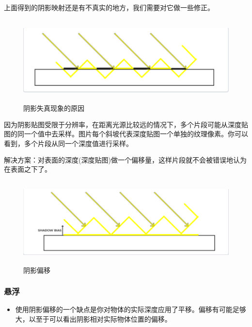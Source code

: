 \documentclass{article}
\begin{document}
	上面得到的阴影映射还是有不真实的地方，我们需要对它做一些修正。
		 \begin{figure}[H]
		\begin{center}
			\includegraphics[width=15cm,height=4.5cm]{yinyingshizhen}
			\caption{阴影失真现象的原因}	\label{yinying.label}
		\end{center}
	\end{figure}

因为阴影贴图受限于分辨率，在距离光源比较远的情况下，多个片段可能从深度贴图的同一个值中去采样。图片每个斜坡代表深度贴图一个单独的纹理像素。你可以看到，多个片段从同一个深度值进行采样。

  解决方案：对表面的深度(深度贴图)做一个偏移量，这样片段就不会被错误地认为在表面之下了。
  
  	 \begin{figure}[H]
  	\begin{center}
  		\includegraphics[width=15cm,height=4.5cm]{bias}
  		\caption{阴影偏移}	\label{pianyi.label}
  	\end{center}
  \end{figure}

	\subsubsection{悬浮}
	
	  \begin{itemize}
		\item 使用阴影偏移的一个缺点是你对物体的实际深度应用了平移。偏移有可能足够大，以至于可以看出阴影相对实际物体位置的偏移。
	\end{itemize}
\end{document}
